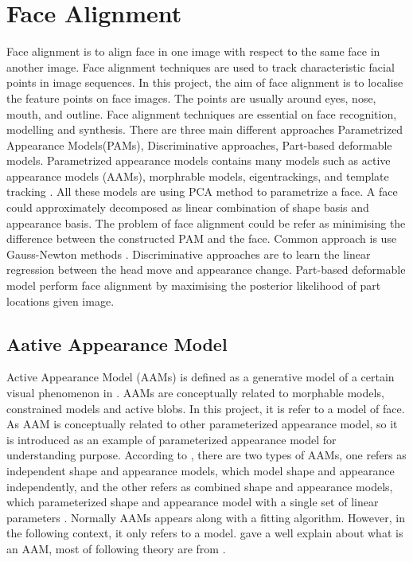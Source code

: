 \section{Face Alignment}
Face alignment is to align face in one image with respect to the same face in another image. Face alignment techniques are used to track characteristic facial points in image sequences. In this project, the aim of face alignment is to localise the feature points on face images. The points are usually around eyes, nose, mouth, and outline. Face alignment techniques are essential on face recognition, modelling and synthesis. There are three main different approaches Parametrized Appearance Models(PAMs), Discriminative approaches, Part-based deformable models. Parametrized appearance models contains many models such as active appearance models (AAMs), morphrable models, eigentrackings, and template tracking \cite{xiong2013supervised}. All these models are using PCA method to parametrize a face. A face could approximately decomposed as linear combination of shape basis and appearance basis. The problem of face alignment could be refer as minimising the difference between the constructed PAM and the face. Common approach is use Gauss-Newton methods \cite{xiong2013supervised}. Discriminative approaches are to learn the linear regression between the head move and appearance change. Part-based deformable model perform face alignment by maximising the posterior likelihood of part locations given image\cite{xiong2013supervised}.

\subsection{Aative Appearance Model}

Active Appearance Model (AAMs) is defined as a generative model of a certain visual phenomenon in \cite{matthews2004active}. AAMs are conceptually related to morphable models, constrained models and active blobs. In this project, it is refer to a model of face. As AAM is conceptually related to other parameterized appearance model, so it is introduced as an example of parameterized appearance model for understanding purpose. According to \cite{matthews2004active}, there are two types of AAMs, one refers as independent shape and appearance models, which model shape and appearance independently, and the other refers as combined shape and appearance models, which parameterized shape and appearance model with a single set of linear parameters \cite{matthews2004active}. Normally AAMs appears along with a fitting algorithm. However, in the following context, it only refers to a model.\cite{matthews2004active} gave a well explain about what is an AAM, most of following theory are from \cite{matthews2004active}. \newline
